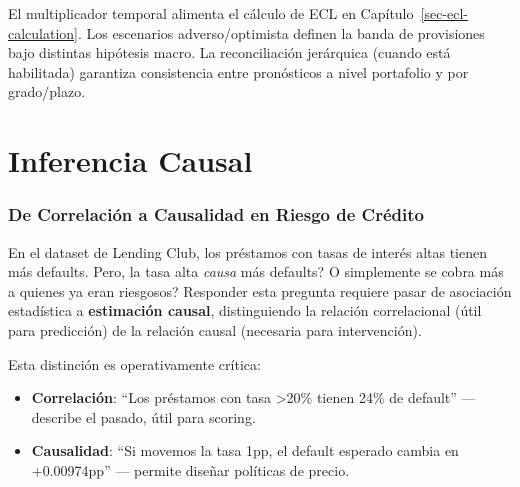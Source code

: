 \documentclass[
  spanish,
  11pt,
  letterpaper,
]{scrbook}
\providecommand{\tightlist}{%
  \setlength{\itemsep}{0pt}\setlength{\parskip}{0pt}}
\theoremstyle{plain}
\theoremstyle{remark}
\begin{document}
\begin{tcolorbox}[enhanced jigsaw, arc=.35mm, bottomrule=.15mm, bottomtitle=1mm, breakable, colback=white, colbacktitle=quarto-callout-tip-color!10!white, colframe=quarto-callout-tip-color-frame, coltitle=black, left=2mm, leftrule=.75mm, opacityback=0, opacitybacktitle=0.6, rightrule=.15mm, title=\textcolor{quarto-callout-tip-color}{\faLightbulb}\hspace{0.5em}{Conexión con el pipeline}, titlerule=0mm, toprule=.15mm, toptitle=1mm]

El multiplicador temporal alimenta el cálculo de ECL en
Capítulo~\ref{sec-ecl-calculation}. Los escenarios adverso/optimista
definen la banda de provisiones bajo distintas hipótesis macro. La
reconciliación jerárquica (cuando está habilitada) garantiza
consistencia entre pronósticos a nivel portafolio y por grado/plazo.

\end{tcolorbox}

\chapter{Inferencia Causal}\label{sec-causal-inference}

\subsection{De Correlación a Causalidad en Riesgo de
Crédito}\label{de-correlaciuxf3n-a-causalidad-en-riesgo-de-cruxe9dito}

En el dataset de Lending Club, los préstamos con tasas de interés altas
tienen más defaults. Pero, la tasa alta \emph{causa} más defaults? O
simplemente se cobra más a quienes ya eran riesgosos? Responder esta
pregunta requiere pasar de asociación estadística a \textbf{estimación
causal}, distinguiendo la relación correlacional (útil para predicción)
de la relación causal (necesaria para intervención).

Esta distinción es operativamente crítica:

\begin{itemize}
\tightlist
\item
  \textbf{Correlación}: ``Los préstamos con tasa \textgreater20\% tienen
  24\% de default'' --- describe el pasado, útil para scoring.
\item
  \textbf{Causalidad}: ``Si movemos la tasa 1pp, el default esperado
  cambia en +0.00974pp'' --- permite diseñar políticas de precio.
\end{itemize}
\end{document}
